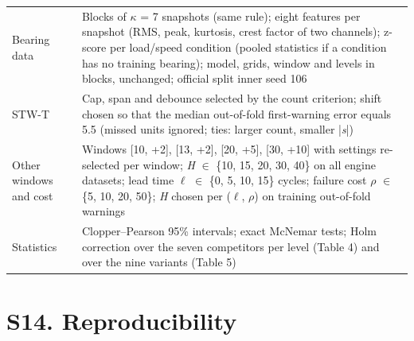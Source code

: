 \documentclass[11pt,a4paper]{article}
\begin{document}
{\begin{longtable}{@{}>{\raggedright\arraybackslash}p{}>{\raggedright\arraybackslash}p{}@{}}
Bearing data & Blocks of $\kappa$ = 7 snapshots (same rule); eight features per snapshot (RMS, peak, kurtosis, crest factor of two channels); z-score per load/speed condition (pooled statistics if a condition has no training bearing); model, grids, window and levels in blocks, unchanged; official split inner seed 106 \\
STW-T & Cap, span and debounce selected by the count criterion; shift chosen so that the median out-of-fold first-warning error equals \textminus{}5.5 (missed units ignored; ties: larger count, smaller |\textit{s}|) \\
Other windows and cost & Windows [\textminus{}10, +2], [\textminus{}13, +2], [\textminus{}20, +5], [\textminus{}30, +10] with settings re-selected per window; \textit{H} $\in$ \{10, 15, 20, 30, 40\} on all engine datasets; lead time $\ell$ $\in$ \{0, 5, 10, 15\} cycles; failure cost $\rho$ $\in$ \{5, 10, 20, 50\}; \textit{H} chosen per ($\ell$, $\rho$) on training out-of-fold warnings \\
Statistics & Clopper--Pearson 95\% intervals; exact McNemar tests; Holm correction over the seven competitors per level (Table 4) and over the nine variants (Table 5) \\
\end{longtable}}

\section*{S14. Reproducibility}
\end{document}
